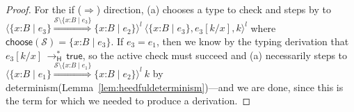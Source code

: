 \documentclass[9pt]{extarticle}
\newcommand{\ottnt}[1]{\mathit{#1}}
\newcommand{\ottsym}[1]{#1}
\begin{document}
{\begin{lemma}
\begin{proof}
{    For the if ($\Rightarrow$) direction, (a) chooses a type to check
    and steps by  to $ \langle   \{ \mathit{x} \mathord{:} \ottnt{B} \mathrel{\mid} \ottnt{e_{{\mathrm{3}}}} \}   \mathord{ \overset{  \mathcal{S}  \setminus   \{ \mathit{x} \mathord{:} \ottnt{B} \mathrel{\mid} \ottnt{e_{{\mathrm{3}}}} \}   }{\Rightarrow} }   \{ \mathit{x} \mathord{:} \ottnt{B} \mathrel{\mid} \ottnt{e_{{\mathrm{2}}}} \}   \rangle^{ \ottnt{l} } ~   \langle   \{ \mathit{x} \mathord{:} \ottnt{B} \mathrel{\mid} \ottnt{e_{{\mathrm{3}}}} \}  ,   \ottnt{e_{{\mathrm{3}}}}  [  \ottnt{k} / \mathit{x}  ]  ,  \ottnt{k}  \rangle^{ \ottnt{l} }  $ where $ \mathsf{choose} ( \mathcal{S} )   \ottsym{=}   \{ \mathit{x} \mathord{:} \ottnt{B} \mathrel{\mid} \ottnt{e_{{\mathrm{3}}}} \} $.
If $\ottnt{e_{{\mathrm{3}}}}  \ottsym{=}  \ottnt{e_{{\mathrm{1}}}}$, then we know by the typing derivation that
    $ \ottnt{e_{{\mathrm{3}}}}  [  \ottnt{k} / \mathit{x}  ]  \,  \longrightarrow ^{*}_{  \mathsf{H}  }  \,  \mathsf{true} $, so the active check must succeed and (a)
    necessarily steps to $ \langle   \{ \mathit{x} \mathord{:} \ottnt{B} \mathrel{\mid} \ottnt{e_{{\mathrm{1}}}} \}   \mathord{ \overset{  \mathcal{S}  \setminus   \{ \mathit{x} \mathord{:} \ottnt{B} \mathrel{\mid} \ottnt{e_{{\mathrm{1}}}} \}   }{\Rightarrow} }   \{ \mathit{x} \mathord{:} \ottnt{B} \mathrel{\mid} \ottnt{e_{{\mathrm{2}}}} \}   \rangle^{ \ottnt{l} } ~  \ottnt{k} $
    by determinism\iffull (Lemma~\ref{lem:heedfuldeterminism})\fi---and we are
    done, since this is the term for which we needed to produce a
    derivation.

}
\end{proof}
\end{lemma}}
\end{document}
